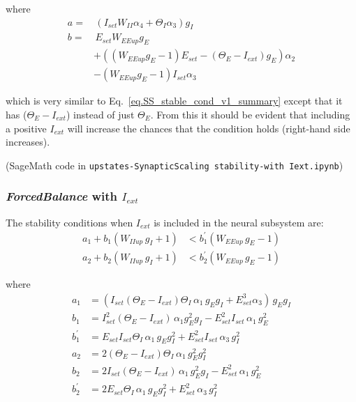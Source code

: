 \documentclass[twocolumn]{article}
\newcommand{\EE}{\mathit{EE}}
\newcommand{\II}{\mathit{II}}
\newcommand{\set}{\mathit{set}}
\newcommand{\ext}{\mathit{ext}}
\newcommand{\up}{\mathit{up}}
\begin{document}
\noindent where
\begin{displaymath}
\begin{aligned}
a = & \, (I_{\set} W_{\II} \alpha_4 + \Theta_I \alpha_3)g_I \\
b = & \, E_{\set} W_{\EE\up}g_E \\
& + ((W_{\EE\up} g_E - 1) E_{\set} - (\Theta_E-I_{\ext}) g_E)\alpha_2 \\
& - (W_{\EE\up} g_E - 1) I_{\set} \alpha_3
\end{aligned}
\end{displaymath}

\noindent which is very similar to Eq.\ \ref{eq.SS_stable_cond_v1_summary} except that it has ($\Theta_E - I_{\ext}$) instead of just $\Theta_E$. From this it should be evident that including a positive $I_{\ext}$ will increase the chances that the condition holds (right-hand side increases).

(SageMath code in {\tt upstates-SynapticScaling stability-with Iext.ipynb})





\subsubsection{{\em ForcedBalance} with $I_{\ext}$}

The stability conditions when $I_{ext}$ is included in the neural subsystem are:
\begin{equation}
\begin{aligned}
a_1 + b_1(W_{\II\up} \, g_I + 1) & < b_1^\prime(W_{\EE\up} \, g_E - 1) \\
a_2 + b_2(W_{\II\up} \, g_I + 1) & < b_2^\prime(W_{\EE\up} \, g_E - 1)
\end{aligned}
\label{eq.FB_stable_cond_nonparadox}
\end{equation}

\noindent where
\begin{displaymath}
\begin{aligned}
a_1 & = (I_{\set} (\Theta_E-I_{ext}) \Theta_I \, \alpha_1 \, g_E g_I + E_{\set}^3 \alpha_3) \, g_E g_I \\
b_1 & = I_{\set}^2 (\Theta_E-I_{ext}) \, \alpha_1 g_E^2 g_I - E_{\set}^2 I_{\set} \, \alpha_1 \, g_E^2 \\
b_1^\prime & = E_{\set} I_{\set} \Theta_I \, \alpha_1 \, g_E g_I^2 + E_{\set}^2 I_{\set} \, \alpha_3 \, g_I^2 \\
a_2 & = 2 (\Theta_E-I_{ext}) \Theta_I \, \alpha_1 \, g_E^2 g_I^2 \\
b_2 & = 2I_{\set} (\Theta_E-I_{ext}) \, \alpha_1 \, g_E^2 g_I - E_{\set}^2 \, \alpha_1 \, g_E^2 \\
b_2^\prime & = 2E_{\set} \Theta_I \, \alpha_1 \, g_E g_I^2 + E_{\set}^2 \, \alpha_3 \, g_I^2
\end{aligned}
\end{displaymath}
\end{document}

